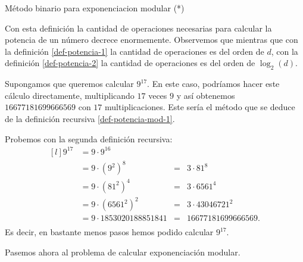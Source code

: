 \begin{section}{Método binario para exponenciacion modular (*)}
    
    Con esta definición la cantidad de operaciones necesarias para calcular la potencia de un número decrece enormemente. Observemos que mientras que con la definición \eqref{def-potencia-1} la cantidad  de operaciones es del orden de $d$,  con la definición \eqref{def-potencia-2} la cantidad de operaciones es del orden de $\log_2(d)$. 
    
    
\begin{ejemplo}\label{ejemplo-9**17}
    Supongamos que queremos calcular $9^{17}$.  En  este caso, podríamos hacer este cálculo  directamente, multiplicando $17$ veces $9$ y así obtenemos $16677181699666569$ con $17$ multiplicaciones. Este sería el método que se deduce de la definición recursiva \eqref{def-potencia-mod-1}. 

    Probemos con la segunda definición recursiva:
    \begin{equation}\label{eq-9**17}
        \begin{matrix*}[l]
            9^{17}  &=  9 \cdot 9^{16}& & \\
                    &=  9 \cdot (9^{2})^8   &=& 3 \cdot 81^8 \\
                    &=  9 \cdot (81^2)^4 &=&  3 \cdot 6561^4  \\
                    &=  9 \cdot (6561^2)^2 &=&  3 \cdot 43046721^2\\
                    &=  9 \cdot 1853020188851841 &=&  16677181699666569.\\
        \end{matrix*}
    \end{equation}
Es decir,  en bastante menos pasos hemos podido calcular $9^{17}$.
\end{ejemplo}

    
    Pasemos ahora al problema de calcular exponenciación modular. 


\end{section}
